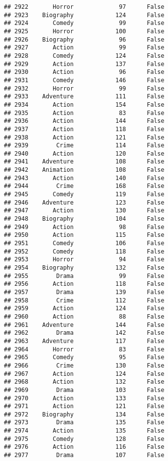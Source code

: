 \documentclass[
]{article}
\begin{document}
\begin{verbatim}
## 2922       Horror             97      False
## 2923    Biography            124      False
## 2924       Comedy             99      False
## 2925       Horror            100      False
## 2926    Biography             96      False
## 2927       Action             99      False
## 2928       Comedy            124      False
## 2929       Action            137      False
## 2930       Action             96      False
## 2931       Comedy            146      False
## 2932       Horror             99      False
## 2933    Adventure            111      False
## 2934       Action            154      False
## 2935       Action             83      False
## 2936       Action            144      False
## 2937       Action            118      False
## 2938       Action            121      False
## 2939        Crime            114      False
## 2940       Action            120      False
## 2941    Adventure            108      False
## 2942    Animation            108      False
## 2943       Action            140      False
## 2944        Crime            168      False
## 2945       Comedy            119      False
## 2946    Adventure            123      False
## 2947       Action            130      False
## 2948    Biography            104      False
## 2949       Action             98      False
## 2950       Action            115      False
## 2951       Comedy            106      False
## 2952       Comedy            118      False
## 2953       Horror             94      False
## 2954    Biography            132      False
## 2955        Drama             99      False
## 2956       Action            118      False
## 2957        Drama            139      False
## 2958        Crime            112      False
## 2959       Action            124      False
## 2960       Action             88      False
## 2961    Adventure            144      False
## 2962        Drama            142      False
## 2963    Adventure            117      False
## 2964       Horror             83      False
## 2965       Comedy             95      False
## 2966        Crime            130      False
## 2967       Action            124      False
## 2968       Action            132      False
## 2969        Drama            103      False
## 2970       Action            133      False
## 2971       Action            121      False
## 2972    Biography            134      False
## 2973        Drama            135      False
## 2974       Action            135      False
## 2975       Comedy            128      False
## 2976       Action            116      False
## 2977        Drama            107      False

\end{verbatim}
\end{document}
